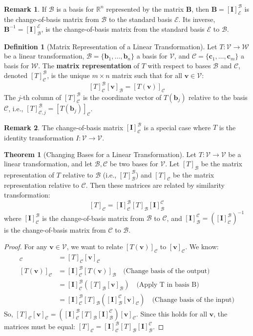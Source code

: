 \documentclass[12pt, letterpaper]{article}
\theoremstyle{definition}
\newtheorem{definition}{Definition}[section]
\newtheorem{theorem}{Theorem}[section]
\newtheorem{remark}{Remark}[section]
\newcommand{\R}{\mathbb{R}}
\newcommand{\V}{\mathcal{V}}
\newcommand{\W}{\mathcal{W}}
\newcommand{\B}{\mathcal{B}}
\newcommand{\C}{\mathcal{C}}
\newcommand{\E}{\mathcal{E}}
\newcommand{\mat}[1]{\mathbf{#1}} %
\newcommand{\vect}[1]{\mathbf{#1}} %
\renewcommand{\v}{\vect{v}} %
\newcommand{\bvec}{\vect{b}} %
\begin{document}
\begin{remark}
If $\B$ is a basis for $\R^n$ represented by the matrix $\mat{B}$, then $\mat{B} = [\mat{I}]_\E^\B$ is the change-of-basis matrix from $\B$ to the standard basis $\E$. Its inverse, $\mat{B}^{-1} = [\mat{I}]_\B^\E$, is the change-of-basis matrix from the standard basis $\E$ to $\B$.
\end{remark}

\begin{definition}[Matrix Representation of a Linear Transformation]
Let $T: \V \to \W$ be a linear transformation, $\B = \{\bvec_1, \dots, \bvec_n\}$ a basis for $\V$, and $\C = \{\vect{c}_1, \dots, \vect{c}_m\}$ a basis for $\W$. The \textbf{matrix representation} of $T$ with respect to bases $\B$ and $\C$, denoted $[T]_\C^\B$, is the unique $m \times n$ matrix such that for all $\v \in \V$:
\[ [T]_\C^\B [\v]_\B = [T(\v)]_\C \]
The $j$-th column of $[T]_\C^\B$ is the coordinate vector of $T(\bvec_j)$ relative to the basis $\C$, i.e., $[T]_{\C, j}^\B = [T(\bvec_j)]_\C$.
\end{definition}

\begin{remark}
The change-of-basis matrix $[\mat{I}]_\C^\B$ is a special case where $T$ is the identity transformation $I: \V \to \V$.
\end{remark}

\begin{theorem}[Changing Bases for a Linear Transformation]
Let $T: \V \to \V$ be a linear transformation, and let $\B, \C$ be two bases for $\V$. Let $[T]_\B$ be the matrix representation of $T$ relative to $\B$ (i.e., $[T]_\B^\B$) and $[T]_\C$ be the matrix representation relative to $\C$. Then these matrices are related by similarity transformation:
\[ [T]_\C = [\mat{I}]_\C^\B [T]_\B [\mat{I}]_\B^\C \]
where $[\mat{I}]_\C^\B$ is the change-of-basis matrix from $\B$ to $\C$, and $[\mat{I}]_\B^\C = ([\mat{I}]_\C^\B)^{-1}$ is the change-of-basis matrix from $\C$ to $\B$.
\end{theorem}
\begin{proof}
For any $\v \in \V$, we want to relate $[T(\v)]_\C$ to $[\v]_\C$. We know:
\begin{align*} [T(\v)]_\C &= [T]_\C [\v]_\C \\ [T(\v)]_\C &= [\mat{I}]_\C^\B [T(\v)]_\B \quad \text{(Change basis of the output)} \\ &= [\mat{I}]_\C^\B ([T]_\B [\v]_\B) \quad \text{(Apply T in basis B)} \\ &= [\mat{I}]_\C^\B [T]_\B ([\mat{I}]_\B^\C [\v]_\C) \quad \text{(Change basis of the input)} \end{align*}
So, $[T]_\C [\v]_\C = ([\mat{I}]_\C^\B [T]_\B [\mat{I}]_\B^\C) [\v]_\C$. Since this holds for all $\v$, the matrices must be equal: $[T]_\C = [\mat{I}]_\C^\B [T]_\B [\mat{I}]_\B^\C$.
\end{proof}
\end{document}
